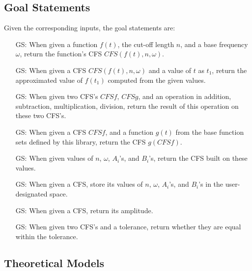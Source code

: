 \documentclass[12pt]{article}
\newcounter{goalnum} %
\begin{document}
\subsection{Goal Statements}

\noindent Given the corresponding inputs, the goal statements are:

\begin{itemize}

\item[GS\refstepcounter{goalnum}\thegoalnum \label{GS:ConvertFromFunc}:] When given a function $f(t)$, the cut-off length $n$, and a base frequency $\omega$, return the function's CFS $\mathit{CFS}(f(t), n, \omega)$.
\item[GS\refstepcounter{goalnum}\thegoalnum \label{GS:FuncValue}:] When given a CFS $\mathit{CFS}(f(t), n, \omega)$ and a value of $t$ as $t_1$, return the approximated value of $f(t_1)$ computed from the given values.
\item[GS\refstepcounter{goalnum}\thegoalnum \label{GS:Operation}:] When given two CFS's $\mathit{CFSf}$, $\mathit{CFSg}$, and an operation in {addition, subtraction, multiplication, division}, return the result of this operation on these two CFS's.
\item[GS\refstepcounter{goalnum}\thegoalnum \label{GS:Function}:] When given a CFS $\mathit{CFSf}$, and a function $g(t)$ from the base function sets defined by this library, return the CFS $g(CFSf)$.
\item[GS\refstepcounter{goalnum}\thegoalnum \label{GS:ConvertFromOther}:] When given values of $n$, $\omega$, $A_i$'s, and $B_i$'s, return the CFS built on these values.
\item[GS\refstepcounter{goalnum}\thegoalnum \label{GS:ConvertToOther}:] When given a CFS, store its values of $n$, $\omega$, $A_i$'s, and $B_i$'s in the user-designated space.
\item[GS\refstepcounter{goalnum}\thegoalnum \label{GS:Amp}:] When given a CFS, return its amplitude.
\item[GS\refstepcounter{goalnum}\thegoalnum \label{GS:ToleratedEquality}:] When given two CFS's and a tolerance, return whether they are equal within the tolerance.
\end{itemize}

\subsection{Theoretical Models} \label{sec_theoretical}
\end{document}
